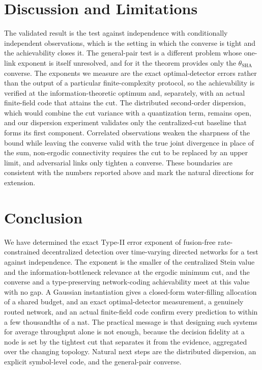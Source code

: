 \documentclass[journal]{IEEEtran}
\theoremstyle{definition}
\theoremstyle{remark}
\newcommand{\tsha}{\theta_{\mathrm{SHA}}}
\begin{document}
\section{Discussion and Limitations}\label{sec:discussion}
The validated result is the test against independence with conditionally independent observations, which is the
setting in which the converse is tight and the achievability closes it. The general-pair test is a different
problem whose one-link exponent is itself unresolved, and for it the theorem provides only the $\tsha$ converse.
The exponents we measure are the exact optimal-detector errors rather than the output of a particular
finite-complexity protocol, so the achievability is verified at the information-theoretic optimum and,
separately, with an actual finite-field code that attains the cut. The distributed second-order dispersion, which
would combine the cut variance with a quantization term, remains open, and our dispersion experiment validates
only the centralized-cut baseline that forms its first component. Correlated observations weaken the sharpness of
the bound while leaving the converse valid with the true joint divergence in place of the sum, non-ergodic
connectivity requires the cut to be replaced by an upper limit, and adversarial links only tighten a converse.
These boundaries are consistent with the numbers reported above and mark the natural directions for extension.

\section{Conclusion}\label{sec:conclusion}
We have determined the exact Type-II error exponent of fusion-free rate-constrained decentralized detection over
time-varying directed networks for a test against independence. The exponent is the smaller of the centralized
Stein value and the information-bottleneck relevance at the ergodic minimum cut, and the converse and a
type-preserving network-coding achievability meet at this value with no gap. A Gaussian instantiation gives a
closed-form water-filling allocation of a shared budget, and an exact optimal-detector measurement, a genuinely
routed network, and an actual finite-field code confirm every prediction to within a few thousandths of a nat.
The practical message is that designing such systems for average throughput alone is not enough, because the
decision fidelity at a node is set by the tightest cut that separates it from the evidence, aggregated over the
changing topology. Natural next steps are the distributed dispersion, an explicit symbol-level code, and the
general-pair converse.



\end{document}
